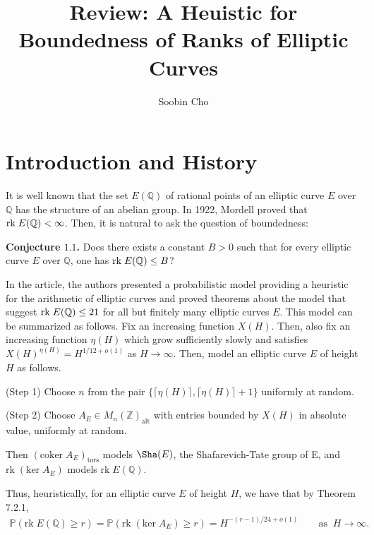 \documentclass[12pt,reqno]{amsart}
\numberwithin{equation}{section}
\def\Z{{\mathbb Z}}
\def\Q{{\mathbb Q}}
\def\P{{\mathbb P}}
\begin{document}
\title
{ \bf Review: A Heuistic for Boundedness of Ranks of Elliptic Curves}
 \author{Soobin Cho}

\maketitle




\section{Introduction and History}

It is well known that the set $E(\Q)$ of rational points of an elliptic curve $E$ over $\Q$ has the structure of an abelian group. In 1922, Mordell proved that ${\rm rk \;} E(\Q) < \infty$. Then, it is natural to ask the question of boundedness: 

\smallskip
{\bf Conjecture $\mathbf{1.1}$.} Does there exists a constant $B>0$  such that for every elliptic curve $E$ over $\Q$, one has ${\rm rk }\; E(\Q) \le B$?

\smallskip

In the article, the authors presented a probabilistic model providing a heuristic for the arithmetic of elliptic curves and proved theorems about the model that suggest  ${\rm rk \;} E(\Q) \le 21$ for all but finitely many elliptic curves $E$. This model can be summarized as follows. Fix an increasing function $X(H)$. Then, also fix an increasing function $\eta(H)$ which grow sufficiently slowly and satisfies $X(H)^{\eta(H)} = H^{1/12 + o(1)}$ as $H \to \infty$. Then, model an elliptic curve $E$ of height $H$ as follows.

\smallskip

\noindent (Step 1) Choose $n$ from the pair $\{\lceil \eta(H) \rceil, \lceil \eta(H) \rceil + 1\}$ uniformly at random.

\noindent (Step 2) Choose $A_E \in M_n(\Z)_{\text{alt}}$ with entries bounded by $X(H)$ in absolute value, uniformly at random.

\noindent Then $(\text{coker} \; A_E)_{\text{tors}}$ models $\Sha(E)$, the Shafarevich-Tate group of E, and $\text{rk}\;(\text{ker} \; A_E)$ models $\text{rk} \; E(\Q)$.

Thus, heuristically, for an elliptic curve $E$ of height $H$, we have that by Theorem 7.2.1,
\begin{align*}
\P(\text{rk} \; E(\Q) \ge r) = \P( \text{rk}\;(\text{ker} \; A_E) \ge r) = H^{-(r-1)/24 + o(1)} \qquad \text{as} \;\; H \to \infty.
\end{align*}
\end{document}
